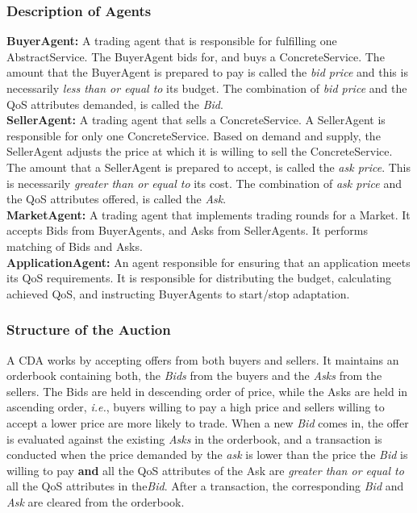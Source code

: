 \documentclass[10pt,journal,compsoc]{IEEEtran}
\begin{document}
\subsubsection{Description of Agents}
\textbf{BuyerAgent:} A trading agent that is responsible for fulfilling one AbstractService. The BuyerAgent bids for, and buys a ConcreteService. The amount that the BuyerAgent is prepared to pay is called the \textsl{bid price} and this is necessarily \textit{less than or equal to} its budget. The combination of \textsl{bid price}  and the QoS attributes demanded, is called the \textsl{Bid}.\\
\textbf{SellerAgent:} A trading agent that sells a ConcreteService. A SellerAgent is responsible for only one ConcreteService. Based on demand and supply, the SellerAgent adjusts the price at which it is willing to sell the ConcreteService. The amount that a SellerAgent is prepared to accept, is called the \textsl{ask price}. This is necessarily \textit{greater than or equal to } its cost. The combination of \textsl{ask price} and the QoS attributes offered, is called the \textsl{Ask}.\\
\textbf{MarketAgent:} A trading agent that implements trading rounds for a Market. It accepts Bids from BuyerAgents, and Asks from SellerAgents. It performs matching of Bids and Asks.\\
\textbf{ApplicationAgent:} An agent responsible for ensuring that an application meets its QoS requirements. It is responsible for distributing the budget, calculating achieved QoS, and instructing BuyerAgents to start/stop adaptation.

\subsubsection{Structure of the Auction}
A CDA works by accepting offers from both buyers and sellers. It maintains an orderbook containing both, the \textsl{Bids} from the buyers and the \textsl{Asks} from the sellers. The Bids are held in descending order of price, while the Asks are held in ascending order, \textit{i.e.}, buyers willing to pay a high price and sellers willing to accept a lower price are more likely to trade. When a new \textit{Bid} comes in, the offer is evaluated against the existing \textit{Asks} in the orderbook, and a transaction is conducted when the price demanded by the \textit{ask} is lower than the price the \textit{Bid} is willing to pay \textbf{and} all the QoS attributes of the Ask are \textit{greater than or equal to} all the QoS attributes in the\textit{Bid}. After a transaction, the corresponding \textit{Bid} and \textit{Ask} are cleared from the orderbook.
\end{document}
